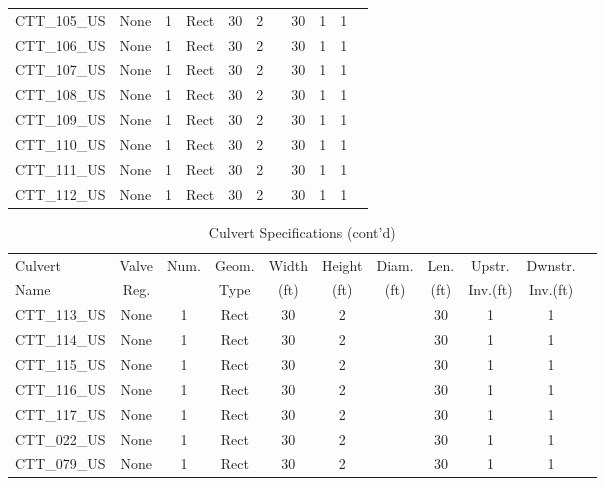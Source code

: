\begin{table}[]
\begin{tabular}{@{}lcccccccccc@{}}
CTT\_105\_US  & None       & 1        & Rect & 30     & 2     &          & 30     & 1         & 1          \\
CTT\_106\_US  & None       & 1        & Rect & 30     & 2     &          & 30     & 1         & 1          \\
CTT\_107\_US  & None       & 1        & Rect & 30     & 2     &          & 30     & 1         & 1          \\
CTT\_108\_US  & None       & 1        & Rect & 30     & 2     &          & 30     & 1         & 1          \\
CTT\_109\_US  & None       & 1        & Rect & 30     & 2     &          & 30     & 1         & 1          \\
CTT\_110\_US  & None       & 1        & Rect & 30     & 2     &          & 30     & 1         & 1          \\
CTT\_111\_US  & None       & 1        & Rect & 30     & 2     &          & 30     & 1         & 1          \\
CTT\_112\_US  & None       & 1        & Rect & 30     & 2     &          & 30     & 1         & 1          \\
\bottomrule
\end{tabular}
\end{table}

\begin{table}[]
\caption{Culvert Specifications (cont'd)}
\label{tab:culv-specs4}
\begin{tabular}{@{}lcccccccccc@{}}
\toprule
Culvert       & Valve      & Num.     & Geom.& Width  & Height & Diam.    & Len.   & Upstr.    & Dwnstr.    \\
Name          & Reg.       &          & Type & (ft)   & (ft)   & (ft)     & (ft)   & Inv.(ft)  & Inv.(ft)   \\
\midrule
CTT\_113\_US  & None       & 1        & Rect & 30     & 2      &          & 30     & 1         & 1          \\
CTT\_114\_US  & None       & 1        & Rect & 30     & 2      &          & 30     & 1         & 1          \\
CTT\_115\_US  & None       & 1        & Rect & 30     & 2      &          & 30     & 1         & 1          \\
CTT\_116\_US  & None       & 1        & Rect & 30     & 2      &          & 30     & 1         & 1          \\
CTT\_117\_US  & None       & 1        & Rect & 30     & 2      &          & 30     & 1         & 1          \\
CTT\_022\_US  & None       & 1        & Rect & 30     & 2      &          & 30     & 1         & 1          \\
CTT\_079\_US  & None       & 1        & Rect & 30     & 2      &          & 30     & 1         & 1          \\
\bottomrule
\end{tabular}
\end{table}

